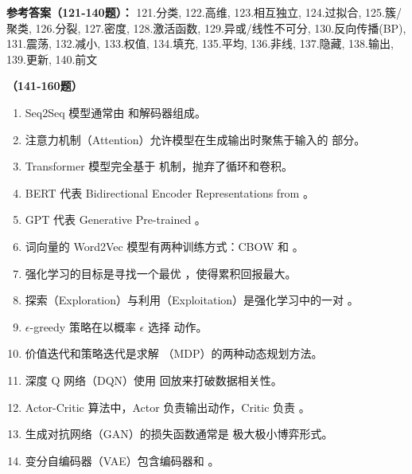 \textbf{参考答案（121-140题）：}
121.分类, 122.高维, 123.相互独立, 124.过拟合, 125.簇/聚类, 126.分裂, 127.密度, 128.激活函数, 129.异或/线性不可分, 130.反向传播(BP), 131.震荡, 132.减小, 133.权值, 134.填充, 135.平均, 136.非线, 137.隐藏, 138.输出, 139.更新, 140.前文

\vspace{1em}
\textbf{（141-160题）}
\begin{enumerate}[resume,leftmargin=2em,itemsep=1pt]
\item Seq2Seq 模型通常由 \underline{\hspace{3em}} 和解码器组成。
\item 注意力机制（Attention）允许模型在生成输出时聚焦于输入的 \underline{\hspace{3em}} 部分。
\item Transformer 模型完全基于 \underline{\hspace{3em}} 机制，抛弃了循环和卷积。
\item BERT 代表 Bidirectional Encoder Representations from \underline{\hspace{3em}}。
\item GPT 代表 Generative Pre-trained \underline{\hspace{3em}}。
\item 词向量的 Word2Vec 模型有两种训练方式：CBOW 和 \underline{\hspace{3em}}。
\item 强化学习的目标是寻找一个最优 \underline{\hspace{3em}}，使得累积回报最大。
\item 探索（Exploration）与利用（Exploitation）是强化学习中的一对 \underline{\hspace{3em}}。
\item $\epsilon$-greedy 策略在以概率 $\epsilon$ 选择 \underline{\hspace{3em}} 动作。
\item 价值迭代和策略迭代是求解 \underline{\hspace{3em}}（MDP）的两种动态规划方法。
\item 深度 Q 网络（DQN）使用 \underline{\hspace{3em}} 回放来打破数据相关性。
\item Actor-Critic 算法中，Actor 负责输出动作，Critic 负责 \underline{\hspace{3em}}。
\item 生成对抗网络（GAN）的损失函数通常是 \underline{\hspace{3em}} 极大极小博弈形式。
\item 变分自编码器（VAE）包含编码器和 \underline{\hspace{3em}}。

\end{enumerate}
